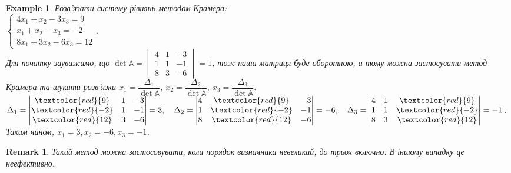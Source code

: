 \documentclass[a4paper, 10pt]{article}
\theoremstyle{theoremdd}
\newtheorem{example}[theorem]{Example}
\newtheorem{remark}[theorem]{Remark}
\begin{document}
\begin{example}
Розв'язати систему рівнянь методом Крамера:\\
$\begin{cases}
4x_1 + x_2 - 3x_3 = 9 \\
x_1 + x_2 - x_3 = -2 \\
8x_1 + 3x_2 - 6x_3 = 12
 \end{cases}$.\\
 Для початку зауважимо, що $\det \mathbb{A} = \begin{vmatrix}
 4 & 1 & - 3\\
 1 & 1 & - 1 \\
 8 & 3 & - 6
 \end{vmatrix} = 1$, тож наша матриця буде оборотною, а тому можна застосувати метод Крамера та шукати розв'язки $x_1 = \dfrac{\Delta_1}{\det \mathbb{A}},\ x_2 = \dfrac{\Delta_2}{\det \mathbb{A}},\ x_3 = \dfrac{\Delta_3}{\det \mathbb{A}}$.\\
$\Delta_1 = \begin{vmatrix}
 \textcolor{red}{9} & 1 & - 3\\
 \textcolor{red}{-2} & 1 & - 1 \\
 \textcolor{red}{12} & 3 & - 6
\end{vmatrix} = 3, \quad \Delta_2 = \begin{vmatrix}
 4 & \textcolor{red}{9} & - 3\\
 1 & \textcolor{red}{-2} & - 1 \\
 8 & \textcolor{red}{12} & - 6
\end{vmatrix} = -6, \quad \Delta_3 = \begin{vmatrix}
 4 & 1 & \textcolor{red}{9} \\
 1 & 1 & \textcolor{red}{-2} \\
 8 & 3 & \textcolor{red}{12}
\end{vmatrix} = -1$.\\
Таким чином, $x_1 = 3, x_2 = -6, x_3 = -1$.
\end{example}

\begin{remark}
Такий метод можна застосовувати, коли порядок визначника невеликий, до трьох включно. В іншому випадку це неефективно.
\end{remark}
\end{document}

